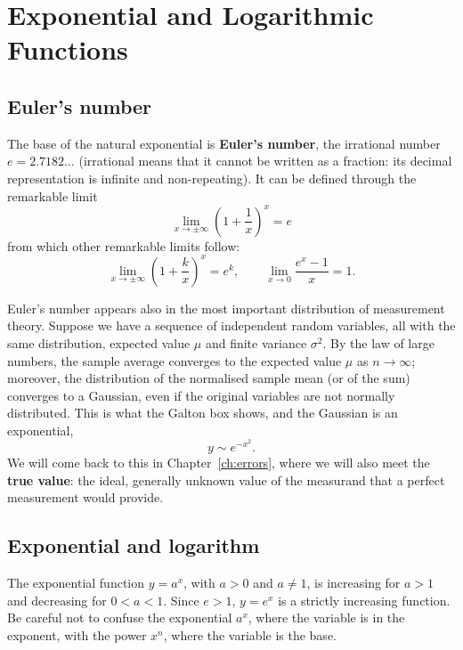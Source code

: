 \documentclass[letterpaper,11pt,leqno]{book}
\begin{document}
\section{Exponential and Logarithmic Functions}
\label{sec:exp_log}

\subsection{Euler's number}

The base of the natural exponential is \textbf{Euler's number}, the irrational number $e = 2.7182\ldots$ (irrational means that it cannot be written as a fraction: its decimal representation is infinite and non-repeating). It can be defined through the remarkable limit
\begin{equation}
\boxed{\lim_{x \to \pm\infty}\left(1 + \frac{1}{x}\right)^x = e}
\label{eq:euler_limit_definition}
\end{equation}
from which other remarkable limits follow:
\begin{equation}
\lim_{x \to \pm\infty}\left(1 + \frac{k}{x}\right)^x = e^k, \qquad \lim_{x \to 0}\frac{e^x - 1}{x} = 1.
\label{eq:euler_derived_limits}
\end{equation}

Euler's number appears also in the most important distribution of measurement theory. Suppose we have a sequence of independent random variables, all with the same distribution, expected value $\mu$ and finite variance $\sigma^2$. By the law of large numbers, the sample average converges to the expected value $\mu$ as $n \to \infty$; moreover, the distribution of the normalised sample mean (or of the sum) converges to a Gaussian, even if the original variables are not normally distributed. This is what the Galton box shows, and the Gaussian is an exponential,
\begin{equation}
y \sim e^{-x^2}.
\label{eq:gaussian_exponential_link}
\end{equation}
We will come back to this in Chapter~\ref{ch:errors}, where we will also meet the \textbf{true value}: the ideal, generally unknown value of the measurand that a perfect measurement would provide.

\subsection{Exponential and logarithm}

The exponential function $y = a^x$, with $a > 0$ and $a \neq 1$, is increasing for $a > 1$ and decreasing for $0 < a < 1$. Since $e > 1$, $y = e^x$ is a strictly increasing function. Be careful not to confuse the exponential $a^x$, where the variable is in the exponent, with the power $x^n$, where the variable is the base.
\end{document}
